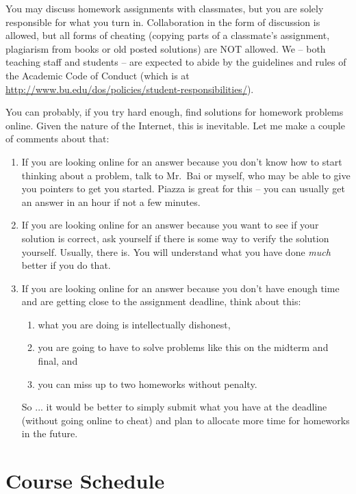 \documentclass[11pt]{article}
\begin{document}
You may discuss homework assignments with classmates, but you are 
solely responsible for what you turn in. Collaboration in the form of
discussion is allowed, but all forms of cheating (copying parts of a
classmate's assignment, plagiarism from books or old posted solutions)
are NOT allowed. We -- both teaching staff and students -- are expected
to abide by the guidelines and rules of the Academic Code of Conduct
(which is at
\url{http://www.bu.edu/dos/policies/student-responsibilities/}).

You can probably, if you try hard enough, find solutions for homework
problems online.    Given the nature of the Internet, this is
inevitable.   Let me make a couple of comments about that:
\begin{enumerate}
\item If you are looking online for an answer because you don't know how
  to start thinking about a problem, talk to Mr.\ Bai or myself, who may be
  able to give you pointers to get you started.  Piazza is great for
  this -- you can usually get an answer in an hour if not a few minutes.
\item If you are looking online for an answer because you want to see if
  your solution is correct, ask yourself if there is some way to verify
  the solution yourself.   Usually, there is.  You will understand what you have done
  \emph{much} better if you do that.
\item If you are looking online for an answer because you don't have
  enough time and are getting close to the assignment deadline, think about this:
  \begin{enumerate}
  \item what you are doing is intellectually dishonest,
  \item you are going to have to solve problems like this on the midterm
    and final, and
  \item you can miss up to two homeworks without penalty.
  \end{enumerate}
So ... it would be better to simply submit what you have at the deadline
(without going online to cheat) and plan to allocate more time for
homeworks in the future.
\end{enumerate}

\newpage
\section*{Course Schedule}
\end{document}
